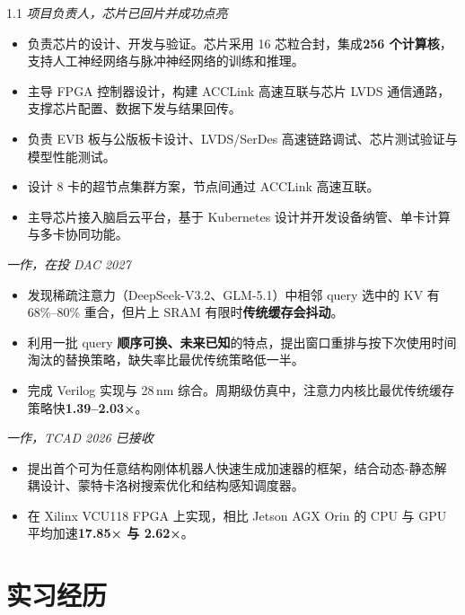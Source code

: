 \documentclass{resume}
\begin{document}
\begin{spacing}{1.1}
		\textit{项目负责人，芯片已回片并成功点亮}
		\begin{itemize}
			\item 负责芯片的设计、开发与验证。芯片采用 16 芯粒合封，集成\textbf{256 个计算核}，支持人工神经网络与脉冲神经网络的训练和推理。
			\item 主导 FPGA 控制器设计，构建 ACCLink 高速互联与芯片 LVDS 通信通路，支撑芯片配置、数据下发与结果回传。
			\item 负责 EVB 板与公版板卡设计、LVDS/SerDes 高速链路调试、芯片测试验证与模型性能测试。
			\item 设计 8 卡的超节点集群方案，节点间通过 ACCLink 高速互联。
			\item 主导芯片接入脑启云平台，基于 Kubernetes 设计并开发设备纳管、单卡计算与多卡协同功能。
		\end{itemize}

		\textit{一作，在投 DAC 2027}
		\begin{itemize}
			\item 发现稀疏注意力（DeepSeek-V3.2、GLM-5.1）中相邻 query 选中的 KV 有 68\%--80\% 重合，但片上 SRAM 有限时\textbf{传统缓存会抖动}。
			\item 利用一批 query \textbf{顺序可换、未来已知}的特点，提出窗口重排与按下次使用时间淘汰的替换策略，缺失率比最优传统策略低一半。
			\item 完成 Verilog 实现与 28\,nm 综合。周期级仿真中，注意力内核比最优传统缓存策略快\textbf{1.39--2.03×}。
		\end{itemize}

		\textit{一作，TCAD 2026 已接收}
		\begin{itemize}
			\item 提出首个可为任意结构刚体机器人快速生成加速器的框架，结合动态-静态解耦设计、蒙特卡洛树搜索优化和结构感知调度器。
			\item 在 Xilinx VCU118 FPGA 上实现，相比 Jetson AGX Orin 的 CPU 与 GPU 平均加速\textbf{17.85× 与 2.62×}。
		\end{itemize}
		
		\section{实习经历}
		

\end{spacing}
\end{document}
